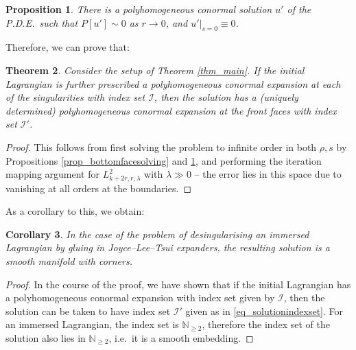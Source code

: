 \documentclass[10pt, a4paper]{article}
\theoremstyle{plain}%
\newtheorem{theorem}{Theorem}[section]
\newtheorem{prop}[theorem]{Proposition}
\newtheorem{coro}[theorem]{Corollary}
\theoremstyle{definition}
\numberwithin{figure}{section}
\numberwithin{equation}{section}
\newcommand{\bN}{\mathbb{N}}
\newcommand{\rt}{\rightarrow}
\newcommand{\cI}{\mathcal{I}}
\begin{document}
\begin{prop}\label{lem_polyconnearff}
	There is a polyhomogeneous conormal solution $u'$ of the P.D.E.\ such that $P[u'] \sim 0$ as $r\rt 0$, and $u'|_{s=0}\equiv 0$.
\end{prop}
Therefore, we can prove that:
 \begin{theorem}\label{thm_asymptotics}
 	 Consider the setup of Theorem \ref{thm_main}. If the initial Lagrangian is further prescribed a polyhomogeneous conormal expansion at each of the singularities  with index set $\cI$, then the solution has a (uniquely determined) polyhomogeneous conormal expansion at the front faces with index set $\cI'$.
 \end{theorem}
 
 \begin{proof}
 	This follows from first solving the problem to infinite order in both $\rho,s$ by Propositions  \ref{prop_bottomfacesolving} and \ref{lem_polyconnearff}, and performing the iteration mapping argument for $L^2_{k+2r,r,\lambda}$ with $\lambda \gg 0$ -- the error lies in this space due to vanishing at all orders at the boundaries.
 \end{proof}

As a corollary to this, we obtain:
\begin{coro}
	In the case of the problem of desingularising an immersed Lagrangian by gluing in Joyce--Lee--Tsui expanders, the resulting solution is a smooth manifold with corners. 
\end{coro}
\begin{proof}
	In the course of the proof, we have shown that if the initial Lagrangian has a polyhomogeneous conormal expansion with index set given by $\cI$, then the solution can be taken to have index set $\cI'$ given as in \eqref{eq_solutionindexset}. For an immersed Lagrangian, the index set is $\bN_{\geq 2}$, therefore the index set of the solution also lies in $\bN_{\geq 2}$, i.e.\ it is a smooth embedding.
\end{proof}





\end{document}
